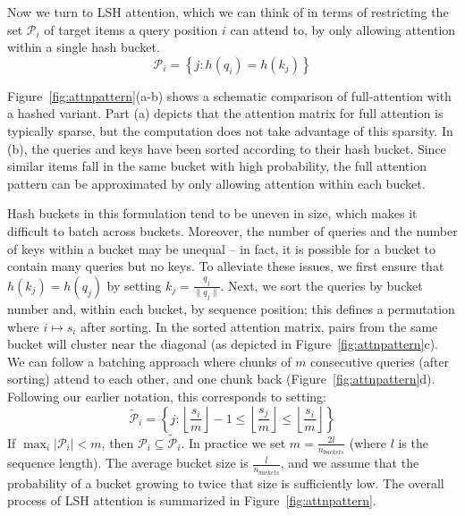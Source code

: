 \documentclass{article} %
\def\pair{\mathcal{P}}
\def\extpair{\widetilde{\mathcal{P}}}
\begin{document}
Now we turn to LSH attention, which we can think of in terms of restricting the set $\pair_i$ of target items a query position $i$ can attend to, by only allowing attention within a single hash bucket.
\begin{equation}
    \pair_i = \left\{ j : h(q_i) = h(k_j) \right\}
\end{equation}

Figure~\ref{fig:attnpattern}(a-b) shows a schematic comparison of full-attention with a hashed variant. Part (a) depicts that the attention matrix for full attention is typically sparse, but the computation does not take advantage of this sparsity. In (b), the queries and keys have been sorted according to their hash bucket. Since similar items fall in the same bucket with high probability, the full attention pattern can be approximated by only allowing attention within each bucket.

Hash buckets in this formulation tend to be uneven in size, which makes it difficult to batch across buckets. Moreover, the number of queries and the number of keys within a bucket may be unequal -- in fact, it is possible for a bucket to contain many queries but no keys. To alleviate these issues, we first ensure that $h(k_j) = h(q_j)$ by setting $k_j = \frac{q_j}{\|q_j\|}$. Next, we sort the queries by bucket number and, within each bucket, by sequence position; this defines a permutation where $i \mapsto s_i$ after sorting. In the sorted attention matrix, pairs from the same bucket will cluster near the diagonal (as depicted in Figure~\ref{fig:attnpattern}c). We can follow a batching approach where chunks of $m$ consecutive queries (after sorting) attend to each other, and one chunk back (Figure~\ref{fig:attnpattern}d). Following our earlier notation, this corresponds to setting:
\begin{equation}
    \extpair_i = \left\{ j : \left\lfloor \frac{s_i}{m}\right\rfloor - 1 \leq \left\lfloor \frac{s_j}{m}\right\rfloor \leq  \left\lfloor \frac{s_i}{m}\right\rfloor \right\}
\end{equation}
%
If $\max_i \left|\pair_i\right| < m$, then $\pair_i \subseteq \extpair_i$. In practice we set $m = \frac{2l}{n_{buckets}}$ (where $l$ is the sequence length). The average bucket size is $\frac{l}{n_{buckets}}$, and we assume that the probability of a bucket growing to twice that size is sufficiently low.
The overall process of LSH attention is summarized in Figure~\ref{fig:attnpattern}.
\end{document}
